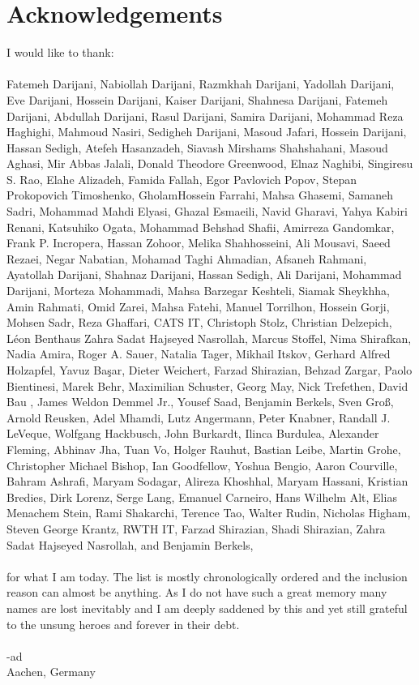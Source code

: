 \chapter*{Acknowledgements}


I would like to thank:\\\\
\noindent Fatemeh Darijani, Nabiollah Darijani, Razmkhah Darijani, Yadollah Darijani, Eve Darijani, Hossein Darijani, 
Kaiser Darijani, Shahnesa Darijani, Fatemeh Darijani, Abdullah Darijani, Rasul Darijani, Samira Darijani, 
Mohammad Reza Haghighi, Mahmoud Nasiri, Sedigheh Darijani, Masoud Jafari, Hossein Darijani, Hassan Sedigh, 
Atefeh Hasanzadeh, Siavash Mirshams Shahshahani, Masoud Aghasi, Mir Abbas Jalali, Donald Theodore Greenwood, Elnaz Naghibi, 
Singiresu S. Rao, Elahe Alizadeh, Famida Fallah, Egor Pavlovich Popov, Stepan Prokopovich Timoshenko, GholamHossein Farrahi, 
Mahsa Ghasemi, Samaneh Sadri, Mohammad Mahdi Elyasi, Ghazal Esmaeili, Navid Gharavi, Yahya Kabiri Renani, Katsuhiko Ogata, 
Mohammad Behshad Shafii, Amirreza Gandomkar, Frank P. Incropera, Hassan Zohoor, Melika Shahhosseini, Ali Mousavi, Saeed Rezaei, Negar Nabatian, 
Mohamad Taghi Ahmadian, Afsaneh Rahmani, Ayatollah Darijani, Shahnaz Darijani, Hassan Sedigh, Ali Darijani, 
Mohammad Darijani, Morteza Mohammadi, Mahsa Barzegar Keshteli, Siamak Sheykhha, Amin Rahmati, Omid Zarei, Mahsa Fatehi, 
Manuel Torrilhon, Hossein Gorji, Mohsen Sadr, Reza Ghaffari, CATS IT, Christoph Stolz, Christian Delzepich, Léon Benthaus  Zahra Sadat Hajseyed Nasrollah, Marcus Stoffel, 
Nima Shirafkan, Nadia Amira, Roger A. Sauer, Natalia Tager, Mikhail Itskov, Gerhard Alfred Holzapfel, Yavuz Başar, 
Dieter Weichert, Farzad Shirazian, Behzad Zargar, Paolo Bientinesi, Marek Behr, Maximilian Schuster, Georg May, 
Nick Trefethen, David Bau {\MakeUppercase{}}, James Weldon Demmel Jr., Yousef Saad, Benjamin Berkels, Sven Groß, 
Arnold Reusken, Adel Mhamdi, Lutz Angermann, Peter Knabner, Randall J. LeVeque, Wolfgang Hackbusch, John Burkardt, 
Ilinca Burdulea, Alexander Fleming, Abhinav Jha,  Tuan Vo, Holger Rauhut, Bastian Leibe, Martin Grohe, Christopher Michael Bishop, Ian Goodfellow, 
Yoshua Bengio, Aaron Courville, Bahram Ashrafi, Maryam Sodagar, Alireza Khoshhal, Maryam Hassani, Kristian Bredies, 
Dirk Lorenz, Serge Lang, Emanuel Carneiro, Hans Wilhelm Alt, Elias Menachem Stein, Rami Shakarchi, Terence Tao, Walter Rudin, Nicholas Higham, 
Steven George Krantz, RWTH IT, Farzad Shirazian, Shadi Shirazian, Zahra Sadat Hajseyed Nasrollah, 
and Benjamin Berkels,\\\\
for what I am today. The list is mostly chronologically ordered and the inclusion reason can almost be anything. 
As I do not have such a great memory many names are lost inevitably and I am deeply saddened by this and yet still 
grateful to the unsung heroes  and forever in their debt.
\\\\
-ad\\
Aachen, Germany\\

\endinput